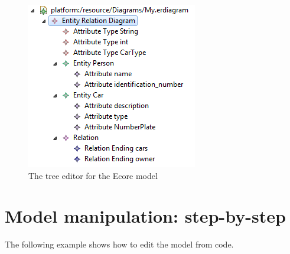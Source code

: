 \documentclass[]{report}
\let\Oldincludegraphics\includegraphics
\renewcommand{\includegraphics}[1]{
\begin{adjustbox}{max size={\textwidth}{\textheight}}
    \Oldincludegraphics[scale=0.6]{#1}%
\end{adjustbox}
}
\begin{document}
\begin{figure}[htbp]
\centering
\includegraphics{img/emf/ERDInstance.png}
\caption{The tree editor for the Ecore model}
\end{figure}

\section{Model manipulation: step-by-step}

The following example shows how to edit the model from code.
\end{document}
